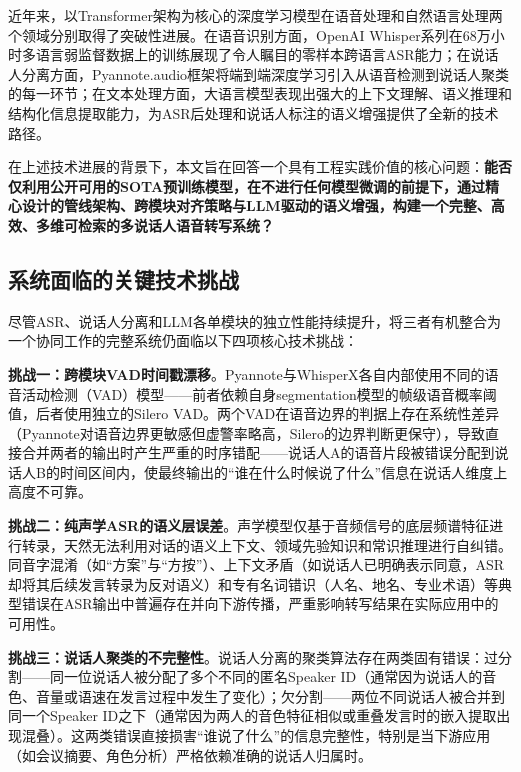 \documentclass[12pt, a4paper]{article}
\begin{document}
近年来，以Transformer架构\cite{vaswani2017transformer}为核心的深度学习模型在语音处理和自然语言处理两个领域分别取得了突破性进展。在语音识别方面，OpenAI Whisper系列\cite{radford2022whisper}在68万小时多语言弱监督数据上的训练展现了令人瞩目的零样本跨语言ASR能力；在说话人分离方面，Pyannote.audio框架\cite{bredin2023pyannote,bredin2024pyannote31}将端到端深度学习引入从语音检测到说话人聚类的每一环节；在文本处理方面，大语言模型表现出强大的上下文理解、语义推理和结构化信息提取能力，为ASR后处理和说话人标注的语义增强提供了全新的技术路径\cite{wang2024llm}。

在上述技术进展的背景下，本文旨在回答一个具有工程实践价值的核心问题：\textbf{能否仅利用公开可用的SOTA预训练模型，在不进行任何模型微调的前提下，通过精心设计的管线架构、跨模块对齐策略与LLM驱动的语义增强，构建一个完整、高效、多维可检索的多说话人语音转写系统？}

\subsection{系统面临的关键技术挑战}

尽管ASR、说话人分离和LLM各单模块的独立性能持续提升，将三者有机整合为一个协同工作的完整系统仍面临以下四项核心技术挑战：

\textbf{挑战一：跨模块VAD时间戳漂移}。Pyannote与WhisperX各自内部使用不同的语音活动检测（VAD）模型——前者依赖自身segmentation模型的帧级语音概率阈值，后者使用独立的Silero VAD\cite{bain2023whisperx}。两个VAD在语音边界的判据上存在系统性差异（Pyannote对语音边界更敏感但虚警率略高，Silero的边界判断更保守），导致直接合并两者的输出时产生严重的时序错配——说话人A的语音片段被错误分配到说话人B的时间区间内，使最终输出的``谁在什么时候说了什么''信息在说话人维度上高度不可靠。

\textbf{挑战二：纯声学ASR的语义层误差}。声学模型仅基于音频信号的底层频谱特征进行转录，天然无法利用对话的语义上下文、领域先验知识和常识推理进行自纠错。同音字混淆（如``方案''与``方按''）、上下文矛盾（如说话人已明确表示同意，ASR却将其后续发言转录为反对语义）和专有名词错识（人名、地名、专业术语）等典型错误在ASR输出中普遍存在并向下游传播，严重影响转写结果在实际应用中的可用性。

\textbf{挑战三：说话人聚类的不完整性}。说话人分离的聚类算法存在两类固有错误\cite{park2022diarization}：过分割——同一位说话人被分配了多个不同的匿名Speaker ID（通常因为说话人的音色、音量或语速在发言过程中发生了变化）；欠分割——两位不同说话人被合并到同一个Speaker ID之下（通常因为两人的音色特征相似或重叠发言时的嵌入提取出现混叠）。这两类错误直接损害``谁说了什么''的信息完整性，特别是当下游应用（如会议摘要、角色分析）严格依赖准确的说话人归属时。
\end{document}
